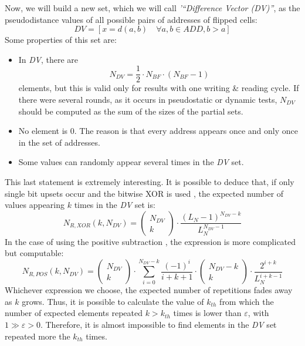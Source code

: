 Now, we will build a new set, which we will call \textit{'``Difference Vector (DV)''}, as the pseudodistance values of all possible pairs of addresses of flipped cells:
%
\begin{equation}
	DV = \left[x = d(a, b) \quad \forall a, b \in ADD, b>a\right]
	\label{Eq:DefinitionOfDV}
\end{equation}
%
Some properties of this set are:
%
\begin{itemize}
	\item In \textit{DV}, there are \begin{equation}N_{DV}=\frac{1}{2}\cdot N_{BF}\cdot \left(N_{BF}-1\right) \label{Eq:SizeOfDV}\end{equation} elements, but this is valid only for results with one writing \& reading cycle. If there were several rounds, as it occurs in pseudostatic or dynamic tests, \(N_{DV}\) should be computed as the sum of the sizes of the partial sets.
	\item No element is \(0\). The reason is that every address appears once and only once in the set of addresses.
	\item Some values can randomly appear several times in the \textit{DV} set.
\end{itemize}
%
This last statement is extremely interesting. It is possible to deduce that, if only single bit upsets occur and the bitwise XOR is used \cite{Franco2017}, the expected number of values appearing \(k\) times in the \textit{DV} set is:
\[
	N_{R,XOR}\left(k, N_{DV}\right) = \left( \begin{matrix} N_{DV}\\ k \end{matrix} \right) \cdot \frac{\left(L_N -1\right)^{N_{DV}-k}}{L_N^{N_{DV}-1}}
\]
In the case of using the positive subtraction \cite{Fabero2020}, the expression is more complicated but computable:
\[
	N_{R,POS}\left(k, N_{DV}\right) =\left( \begin{matrix} N_{DV}\\ k \end{matrix} \right) \cdot \sum_{i=0}^{N_{DV}-k}{\frac{(-1)^i}{i+k+1} \cdot \left( \begin{matrix} N_{DV}-k\\ k \end{matrix} \right) \cdot \frac{2^{i+k}}{L_N^{i+k-1}}}
\]
Whichever expression we choose, the expected number of repetitions fades away as \(k\) grows. Thus, it is possible to calculate the value of \(k_{th}\) from which the number of expected elements repeated \(k > k_{th}\) times is lower than \(\varepsilon\), with \(1\gg \varepsilon > 0\). Therefore, it is almost impossible to find elements in the \textit{DV} set repeated more the \(k_{th}\) times. 

